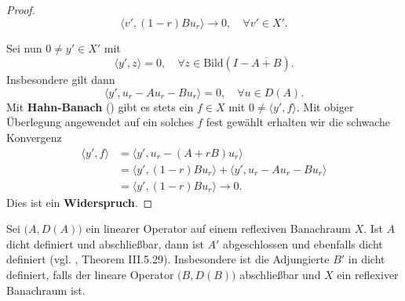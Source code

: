 \begin{proof}
\begin{equation*}
  \langle v', (1-r)Bu_r\rangle \to  0,\quad\forall v'\in X'.
\end{equation*}
\par
Sei nun $0\neq y'\in X'$ mit 
\begin{equation*}
    \langle y', z\rangle =0,\quad\forall z\in\text{Bild}(I-\overline{A+B}).
\end{equation*}
Insbesondere gilt dann 
\begin{equation*}
    \langle y', u_r-Au_r-Bu_r\rangle =0,\quad\forall u\in D(A).
\end{equation*}
Mit \textbf{Hahn-Banach} () gibt es stets ein $f\in X$ mit $0\neq\langle y', f\rangle$. Mit obiger Überlegung angewendet auf ein solches $f$ fest gewählt erhalten wir die schwache Konvergenz 
\begin{align*}
\langle y', f\rangle 
&=\langle y', u_r-(A+rB)u_r\rangle\\
&=\langle y', (1-r)Bu_r\rangle + \langle y', u_r - Au_r -Bu_r\rangle\\
&=\langle y', (1-r)Bu_r\rangle \to 0.
\end{align*}
Dies ist ein \textbf{Widerspruch}. %
\end{proof}

\begin{bem}\label{Kato Dual Satz}\label{Kato Dual abgeschlossen und dicht definiert}
Sei $\big(A, D(A)\big)$ ein linearer Operator auf einem reflexiven Banachraum $X$. Ist $A$ dicht definiert und abschließbar, dann ist $A'$ abgeschlossen und ebenfalls dicht definiert (vgl. \cite{kato_1995}, Theorem III.5.29). Insbesondere ist die Adjungierte $B'$ in  dicht definiert, falls der lineare Operator $\big(B, D(B)\big)$ abschließbar und $X$ ein reflexiver Banachraum ist.
\end{bem}


